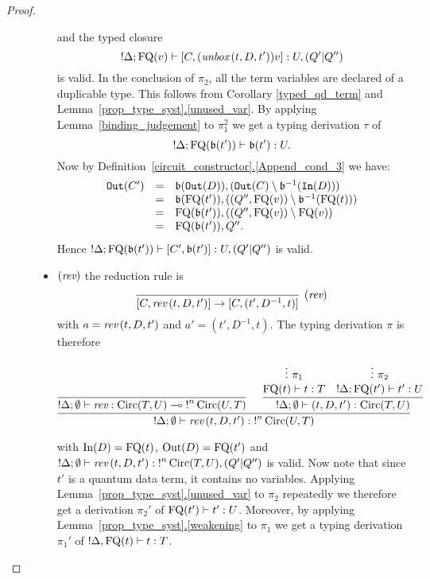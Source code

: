 \documentclass[twoside]{article}
\begin{document}
\begin{proof}
\begin{description}
\begin{itemize}
  and the typed closure
  \[
  {!}\Delta; \mathop{\textrm{FQ}}\nolimits(v) \vdash [C,(\mathop{\textit{unbox}}\nolimits\,(t,D,t'))v] :U,(Q'|Q'')
  \] 
  is valid. In the conclusion of $\pi_2$, all the 
  term variables are declared of a duplicable type. This 
  follows from Corollary \ref{typed_qd_term} and 
  Lemma~\hyperref[unused_var]{\ref*{prop_type_syst}.\ref*{unused_var}}. 
  By applying Lemma~\hyperref[binding_judgement]{\ref*{binding_judgement}} 
  to $\pi_1^2$ we get a typing derivation $\tau$ of 
  \[
  {!}\Delta;\mathop{\textrm{FQ}}\nolimits(\mathfrak{b}(t'))\vdash \mathfrak{b}(t'):U.
  \]
  Now by 
  Definition~\hyperref[Append_cond_3]{\ref*{circuit_constructor}.\ref*{Append_cond_3}} 
  we have:
  \[
  \begin{array}{rcl}
  \mathtt{Out}(C') & = & \mathfrak{b}(\mathtt{Out}(D)), (\mathtt{Out}(C)\setminus\mathfrak{b}^{-1}(\mathtt{In}(D))) \\
                   & = & \mathfrak{b}(\mathop{\textrm{FQ}}\nolimits(t')) , ((Q'',\mathop{\textrm{FQ}}\nolimits(v))\setminus \mathfrak{b}^{-1}(\mathop{\textrm{FQ}}\nolimits(t))) \\
                   & = & \mathop{\textrm{FQ}}\nolimits(\mathfrak{b}(t')) , ((Q'',\mathop{\textrm{FQ}}\nolimits(v))\setminus \mathop{\textrm{FQ}}\nolimits(v)) \\
                   & = & \mathop{\textrm{FQ}}\nolimits(\mathfrak{b}(t')),Q''.                   
  \end{array}
  \]
  Hence ${!}\Delta; \mathop{\textrm{FQ}}\nolimits(\mathfrak{b}(t'))\vdash [C',\mathfrak{b}(t')] :U,(Q'|Q'')$  is valid.
  \item $(\mathop{\textit{rev}}\nolimits)$ the reduction rule is
  \[
    \infer[(\rev)]{[C,\rev\,(t,D,t')]\to [C,(t',D^{-1},t)]}{}
  \]
  with $a=\mathop{\textit{rev}}\nolimits\,(t,D,t')$ and $a'=(t',D^{-1},t)$. The typing derivation $\pi$ 
  is therefore
  \begin{footnotesize}
  \[
  \infer[]{{!}\Delta;\emptyset\entails \rev\,(t,D,t'):{!}^n\Circ(U,T)}{
    \infer[]{{!}\Delta;\emptyset \entails \rev:\Circ(T,U)\loli {!}^n\Circ(U,T)}{
    }   
    &
    \infer[]{{!}\Delta ;\emptyset\entails (t,D,t'):\Circ(T,U)}{
      \deduce[]{\FQ(t)\entails t:T}{
        \vdots ~\pi_1
      }
      &
      \deduce[]{{!}\Delta;\FQ(t')\entails t':U}{
        \vdots ~\pi_2     
      }
    }
  }
  \]
  \end{footnotesize}  
  with $\mathop{\textrm{In}}\nolimits(D)=\mathop{\textrm{FQ}}\nolimits(t)$, $\mathop{\textrm{Out}}\nolimits(D)=\mathop{\textrm{FQ}}\nolimits(t')$ and 
  ${!}\Delta;\emptyset\vdash \mathop{\textit{rev}}\nolimits\,(t,D,t'):{!}^n\mathop{\textrm{Circ}}\nolimits(T,U),(Q'|Q'')$ is 
  valid. Now note that since $t'$ is a quantum data term, it contains no variables. 
  Applying Lemma~\hyperref[unused_var]{\ref*{prop_type_syst}.\ref*{unused_var}} 
  to $\pi_2$ repeatedly we therefore get a derivation $\pi_2'$ of 
  $\mathop{\textrm{FQ}}\nolimits(t')\vdash t':U$. Moreover, by applying
  Lemma~\hyperref[weakening]{\ref*{prop_type_syst}.\ref*{weakening}} to $\pi_1$ 
  we get a typing derivation $\pi_1'$ of ${!}\Delta ,\mathop{\textrm{FQ}}\nolimits(t)\vdash t:T$.

\end{itemize}
\end{description}
\end{proof}
\end{document}
